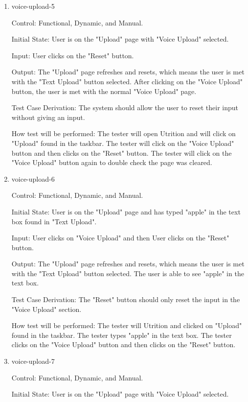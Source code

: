\documentclass[12pt, titlepage]{article}
\begin{document}
\begin{enumerate}
	\item{voice-upload-5\\}
	
	Control: Functional, Dynamic, and Manual.
	
	Initial State: User is on the "Upload" page with "Voice Upload" selected.
	
	Input: User clicks on the "Reset" button.
	
	Output: The "Upload" page refreshes and resets, which means the user is met with the "Text Upload" button selected. After clicking on the "Voice Upload" button, the user is met with the normal "Voice Upload" page.
	
	Test Case Derivation: The system should allow the user to reset their input without giving an input.
	
	How test will be performed: The tester will open Utrition and will click on "Upload" found in the taskbar. The tester will click on the "Voice Upload" button and then clicks on the "Reset" button. The tester will click on the "Voice Upload" button again to double check the page was cleared. 
	
	\item{voice-upload-6\\}
	
	Control: Functional, Dynamic, and Manual.
	
	Initial State: User is on the "Upload" page and has typed "apple" in the text box found in "Text Upload".
	
	Input: User clicks on "Voice Upload" and then User clicks on the "Reset" button.
	
	Output: The "Upload" page refreshes and resets, which means the user is met with the "Text Upload" button selected. The user is able to see "apple" in the text box.
	
	Test Case Derivation: The "Reset" button should only reset the input in the "Voice Upload" section.
	
	How test will be performed: The tester will Utrition and clicked on "Upload" found in the taskbar. The tester types "apple" in the text box. The tester clicks on the "Voice Upload" button and then clicks on the "Reset" button.
	
	\item{voice-upload-7\\}
	
	Control: Functional, Dynamic, and Manual.
	
	Initial State: User is on the "Upload" page with "Voice Upload" selected.
	

\end{enumerate}
\end{document}
